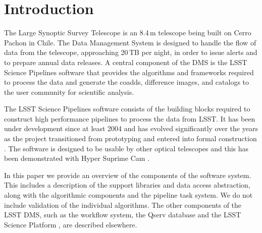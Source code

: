 \section{Introduction}

The Large Synoptic Survey Telescope \citep[LSST;][]{2008arXiv0805.2366I} is an 8.4\,m telescope being built on Cerro Pachon in Chile.
The Data Management System \citep[DMS;][]{2015arXiv151207914J} is designed to handle the flow of data from the telescope, approaching 20\,TB per night, in order to issue alerts and to prepare annual data releases.
A central component of the DMS is the LSST Science Pipelines software that provides the algorithms and frameworks required to process the data and generate the coadds, difference images, and catalogs to the user community for scientific analysis.

The LSST Science Pipelines software consists of the building blocks required to construct high performance pipelines to process the data from LSST.
It has been under development since at least 2004 \citep{2004AAS...20510811A} and has evolved significantly over the years as the project transitioned from prototyping \citep{2010SPIE.7740E..15A} and entered into formal construction \citep{2018SPIE10707-10J}.
The software is designed to be usable by other optical telescopes and this has been demonstrated with Hyper Suprime Cam \citep{2018PASJ...70S...5B}.

In this paper we provide an overview of the components of the software system.
This includes a description of the support libraries and data access abstraction, along with the algorithmic components and the pipeline task system.
We do not include validation of the individual algorithms.
The other components of the LSST DMS, such as the workflow system, the Qserv database \citep{Wang:2011:QDS:2063348.2063364} and the LSST Science Platform \citep{LSE-319}, are described elsewhere.
